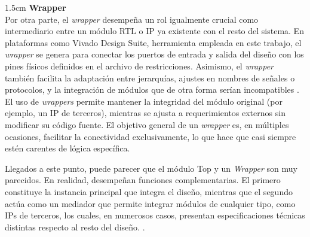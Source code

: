 \vspace{0.4em} %

\begin{adjustwidth}{1.5cm}{}
\label{st:wrapper}
\textbf{Wrapper} \vspace{0.25cm} \\
Por otra parte, el \textit{wrapper} desempeña un rol igualmente crucial como intermediario entre un módulo RTL o IP ya existente con el resto del sistema. En plataformas como Vivado Design Suite, herramienta empleada en este trabajo, el \textit{wrapper} se genera para conectar los puertos de entrada y salida del diseño con los pines físicos definidos en el archivo de restricciones. Asimismo, el \textit{wrapper} también facilita la adaptación entre jerarquías, ajustes en nombres de señales o protocolos, y la integración de módulos que de otra forma serían incompatibles \cite{infoWrapper}. El uso de \textit{wrappers} permite mantener la integridad del módulo original (por ejemplo, un IP de terceros), mientras se ajusta a requerimientos externos sin modificar su código fuente. El objetivo general de un \textit{wrapper} es, en múltiples ocasiones, facilitar la conectividad exclusivamente, lo que hace que casi siempre estén carentes de lógica específica. 

Llegados a este punto, puede parecer que el módulo Top y un \textit{Wrapper} son muy parecidos. En realidad, desempeñan funciones complementarias. El primero constituye la instancia principal que integra el diseño, mientras que el segundo actúa como un mediador que permite integrar módulos de cualquier tipo, como IPs de terceros, los cuales, en numerosos casos, presentan especificaciones técnicas distintas respecto al resto del diseño. \cite{infoWrapper}.
\end{adjustwidth}

\vspace{0.4em} %


